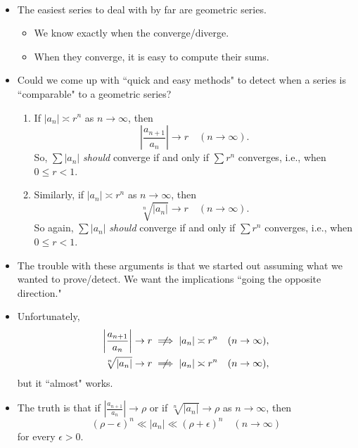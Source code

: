 \begin{remark}\,
\begin{itemize}
\item The easiest series to deal with by far are geometric series.
\begin{itemize}
\item We know exactly when the converge/diverge.
\item When they converge, it is easy to compute their sums.
\end{itemize}
\item Could we come up with ``quick and easy methods" to detect when a series is ``comparable" to a geometric series?
\begin{enumerate}
\item If $|a_n|\asymp r^n$ as $n\to\infty$, then
\begin{equation*}
\left|\frac{a_{n+1}}{a_n}\right| \to r\quad (n\to\infty).
\end{equation*}
So, $\sum |a_n|$ \textit{should} converge if and only if $\sum r^n$ converges, i.e., when $0\le r < 1$.
\item Similarly, if $|a_n|\asymp r^n$ as $n\to\infty$, then
\begin{equation*}
\sqrt[n]{|a_n|} \to r\quad (n\to\infty).
\end{equation*}
So again, $\sum |a_n|$ \textit{should} converge if and only if $\sum r^n$ converges, i.e., when $0\le r < 1$.
\end{enumerate}
\item The trouble with these arguments is that we started out assuming what we wanted to prove/detect.
We want the implications ``going the opposite direction."
\item Unfortunately,
\begin{align*}
\left|\frac{a_{n+1}}{a_n}\right|\to r &\centernot\implies |a_n|\asymp r^n \quad (n\to\infty),\\
\sqrt[n]{|a_n|}\to r &\centernot\implies |a_n|\asymp r^n \quad (n\to\infty),
\end{align*}
but it ``almost" works.
\item The truth is that if $\left|\frac{a_{n+1}}{a_n}\right|\to \rho$ or if $\sqrt[n]{|a_n|}\to \rho$ as $n\to\infty$, then
\begin{equation*}
(\rho-\epsilon)^n\ll |a_n|\ll (\rho+\epsilon)^n\quad (n\to\infty)
\end{equation*}
for every $\epsilon>0$.
\end{itemize}
\end{remark}

